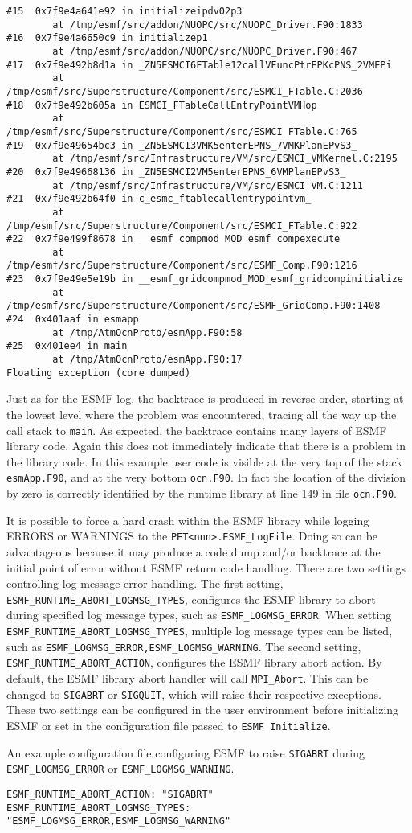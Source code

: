 \begin{verbatim}
#15  0x7f9e4a641e92 in initializeipdv02p3
        at /tmp/esmf/src/addon/NUOPC/src/NUOPC_Driver.F90:1833
#16  0x7f9e4a6650c9 in initializep1
        at /tmp/esmf/src/addon/NUOPC/src/NUOPC_Driver.F90:467
#17  0x7f9e492b8d1a in _ZN5ESMCI6FTable12callVFuncPtrEPKcPNS_2VMEPi
        at /tmp/esmf/src/Superstructure/Component/src/ESMCI_FTable.C:2036
#18  0x7f9e492b605a in ESMCI_FTableCallEntryPointVMHop
        at /tmp/esmf/src/Superstructure/Component/src/ESMCI_FTable.C:765
#19  0x7f9e49654bc3 in _ZN5ESMCI3VMK5enterEPNS_7VMKPlanEPvS3_
        at /tmp/esmf/src/Infrastructure/VM/src/ESMCI_VMKernel.C:2195
#20  0x7f9e49668136 in _ZN5ESMCI2VM5enterEPNS_6VMPlanEPvS3_
        at /tmp/esmf/src/Infrastructure/VM/src/ESMCI_VM.C:1211
#21  0x7f9e492b64f0 in c_esmc_ftablecallentrypointvm_
        at /tmp/esmf/src/Superstructure/Component/src/ESMCI_FTable.C:922
#22  0x7f9e499f8678 in __esmf_compmod_MOD_esmf_compexecute
        at /tmp/esmf/src/Superstructure/Component/src/ESMF_Comp.F90:1216
#23  0x7f9e49e5e19b in __esmf_gridcompmod_MOD_esmf_gridcompinitialize
        at /tmp/esmf/src/Superstructure/Component/src/ESMF_GridComp.F90:1408
#24  0x401aaf in esmapp
        at /tmp/AtmOcnProto/esmApp.F90:58
#25  0x401ee4 in main
        at /tmp/AtmOcnProto/esmApp.F90:17
Floating exception (core dumped)
\end{verbatim}

Just as for the ESMF log, the backtrace is produced in reverse order, starting
at the lowest level where the problem was encountered, tracing all the way up
the call stack to {\tt main}. As expected, the backtrace contains many
layers of ESMF library code. Again this does not immediately indicate that there
is a problem in the library code. In this example user code is visible at the
very top of the stack {\tt esmApp.F90}, and at the very bottom {\tt ocn.F90}.
In fact the location of the division by zero is correctly identified by the
runtime library at line 149 in file {\tt ocn.F90}.

It is possible to force a hard crash within the ESMF library while logging
ERRORS or WARNINGS to the {\tt PET<nnn>.ESMF\_LogFile}. Doing so can be
advantageous because it may produce a code dump and/or backtrace at the
initial point of error without ESMF return code handling. There are two
settings controlling log message error handling. The first setting,
{\tt ESMF\_RUNTIME\_ABORT\_LOGMSG\_TYPES}, configures the ESMF library to abort
during specified log message types, such as {\tt ESMF\_LOGMSG\_ERROR}. When
setting {\tt ESMF\_RUNTIME\_ABORT\_LOGMSG\_TYPES}, multiple log message types
can be listed, such as {\tt ESMF\_LOGMSG\_ERROR,ESMF\_LOGMSG\_WARNING}. The
second setting, {\tt ESMF\_RUNTIME\_ABORT\_ACTION}, configures the ESMF library
abort action. By default, the ESMF library abort handler will call
{\tt MPI\_Abort}. This can be changed to {\tt SIGABRT} or {\tt SIGQUIT}, which
will raise their respective exceptions. These two settings can be configured in
the user environment before initializing ESMF or set in the configuration file
passed to {\tt ESMF\_Initialize}.

An example configuration file configuring ESMF to raise {\tt SIGABRT} during
{\tt ESMF\_LOGMSG\_ERROR} or {\tt ESMF\_LOGMSG\_WARNING}.

\begin{verbatim}
ESMF_RUNTIME_ABORT_ACTION: "SIGABRT"
ESMF_RUNTIME_ABORT_LOGMSG_TYPES: "ESMF_LOGMSG_ERROR,ESMF_LOGMSG_WARNING"
\end{verbatim}
